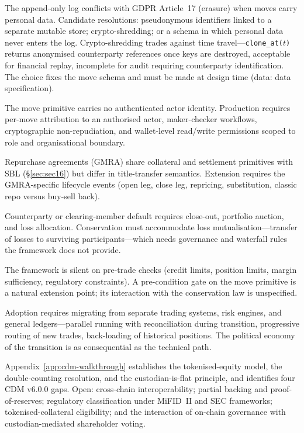\begin{description}[nosep]
\item[Data privacy and GDPR.] The append-only log conflicts with GDPR Article~17 (erasure) when moves carry personal data. Candidate resolutions: pseudonymous identifiers linked to a separate mutable store; crypto-shredding; or a schema in which personal data never enters the log. Crypto-shredding trades against time travel---\allowbreak\texttt{clone\_at(\allowbreak$t$)} returns anony\-mised counterparty references once keys are destroyed, acceptable for financial replay, incomplete for audit requiring counterparty identification. The choice fixes the move schema and must be made at design time (data: data specification).
\item[Access control and actor attribution.] The move primitive carries no authenticated actor identity. Production requires per-move attribution to an authorised actor, maker-checker workflows, cryptographic non-repudiation, and wallet-level read/write permissions scoped to role and organisational boundary.
\item[Repos.] Repurchase agreements (GMRA) share collateral and settlement primitives with SBL (\S\ref{sec:sec16}) but differ in title-transfer semantics. Extension requires the GMRA-specific lifecycle events (open leg, close leg, repricing, substitution, classic repo versus buy-sell back).
\item[Default management.] Counterparty or clearing-member default requires close-out, portfolio auction, and loss allocation. Conservation must accommodate loss mutualisation---transfer of losses to surviving participants---which needs governance and waterfall rules the framework does not provide.
\item[Pre-trade validation.] The framework is silent on pre-trade checks (credit limits, position limits, margin sufficiency, regulatory constraints). A pre-condition gate on the move primitive is a natural extension point; its interaction with the conservation law is unspecified.
\item[Migration from legacy architectures.] Adoption requires migrating from separate trading systems, risk engines, and general ledgers---parallel running with reconciliation during transition, progressive routing of new trades, back-loading of historical positions. The political economy of the transition is as consequential as the technical path.
\item[Tokenised securities.] Appendix~\ref{app:cdm-walkthrough} establishes the tokenised-equity model, the double-counting resolution, and the custodian-is-flat principle, and identifies four CDM v6.0.0 gaps. Open: cross-chain interoperability; partial backing and proof-of-reserves; regulatory classification under MiFID~II and SEC frameworks; tokenised-collateral eligibility; and the interaction of on-chain governance with custodian-mediated shareholder voting.
\end{description}

